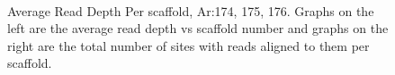 \documentclass[../main.tex]{subfiles}
\begin{document}
\begin{figure}[H]
\begin{centering}
		\\
		\begin{singlespace}
			\vspace{-0.5cm}
			\caption[Average Read Depth Per scaffold, Ar:174, 175, 176]{Average Read Depth Per scaffold, Ar:174, 175, 176. Graphs on the left are the average read depth vs scaffold number and graphs on the right are the total number of sites with reads aligned to them per scaffold.}\label{avg_rd_graphs_3}
		\end{singlespace}	
	\end{centering}
\end{figure}
\end{document}
